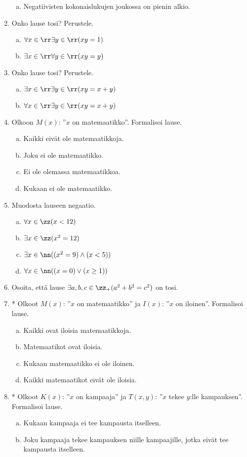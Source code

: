 \begin{tehtavasivu}
\begin{enumerate}
\begin{enumerate}[a)]
\item Negatiivisten kokonaislukujen joukossa on pienin alkio.
\end{enumerate}%
\item Onko lause tosi? Perustele.
\begin{enumerate}[a)]
\item $\forall x\in \rr\exists y\in \rr (xy=1)$
\item $\exists x\in \rr\forall y\in \rr (xy=y)$
\end{enumerate}%
\item Onko lause tosi? Perustele. %
\begin{enumerate}[a)]
\item $\exists x\in \rr\exists y\in \rr (xy=x+y)$
\item $\forall x\in \rr\exists y\in \rr (xy=x+y)$ 
\end{enumerate}%
\item Olkoon $M(x)$: ''$x$ on matemaatikko''. Formalisoi lause.%
\begin{enumerate}[a)]
\item Kaikki eivät ole matemaatikkoja.
\item Joku ei ole matemaatikko.
\item Ei ole olemassa matemaatikkoa.
\item Kukaan ei ole matemaatikko.
\end{enumerate}%
\item
Muodosta lauseen negaatio.
\begin{enumerate}[a)]
\item $\forall x\in \zz (x < 12)$
\item $\exists x\in \zz (x^2 = 12)$
\item $\exists x\in \nn ((x^2=9) \land (x<5))$
\item $\forall x\in \nn ((x=0)\lor (x\ge 1))$
\end{enumerate}%
\item Osoita, että lause $\exists a, b, c \in \zz_{+} (a^2 + b^2 =
c^2)$ on tosi.%
\item *
Olkoot $M(x)$: ''$x$ on matemaatikko'' ja
$I(x)$: ''$x$ on iloinen''. Formalisoi lause.
\begin{enumerate}[a)]
\item Kaikki ovat iloisia matemaatikkoja.
\item Matemaatikot ovat iloisia.
\item Kukaan matemaatikko ei ole iloinen.
\item Kaikki matemaatikot eivät ole iloisia.
\end{enumerate}%
\item *
Olkoot $K(x)$: ''$x$ on kampaaja'' ja
$T(x, y)$: ''$x$ tekee $y$:lle kampauksen''. Formalisoi lause.
\begin{enumerate}[a)]
\item Kukaan kampaaja ei tee kampausta itselleen.
\item Joku kampaaja tekee kampauksen niille kampaajille,
jotka eivät tee kampausta itselleen.
\end{enumerate}%
\end{enumerate}%

\end{tehtavasivu}
